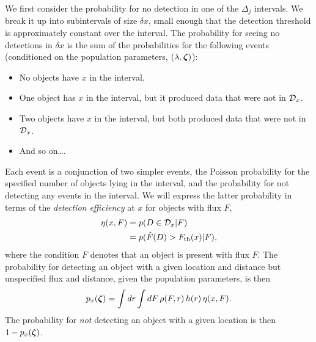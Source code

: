 We first consider the probability for no detection in one of the $\Delta_j$ intervals.
We break it up into subintervals of size $\delta x$, small enough that the detection threshold is approximately constant over the interval.
The probability for seeing no detections in $\delta x$ is the sum of the probabilities for the following events (conditioned on the population parameters, $(\lambda,\boldsymbol{\zeta})$):
\begin{itemize}
\item No objects have $x$ in the interval.
\item One object has $x$ in the interval, but it produced data that were not in $\mathcal{D}_x$.
\item Two objects have $x$ in the interval, but both produced data that were not in $\mathcal{D}_x$.
\item And so on\ldots.
\end{itemize}
Each event is a conjunction of two simpler events, the Poisson probability for the specified number of objects lying in the interval, and the probability for not detecting any events in the interval.
We will express the latter probability in terms of the \emph{detection efficiency} at $x$ for objects with flux $F$,
\begin{align}\label{eq:eta-def}
\eta(x,F) 
  &= p(D\in\mathcal{D}_x | F)\\
  &= p(\hat{F}(D) > F_{\rm th}(x) | F),
\end{align}
where the condition $F$ denotes that an object is present with flux $F$.
The probability for detecting an object with a given location and distance but unspecified flux and distance, given the population parameters, is then
\begin{equation}\label{eq:p-x}
p_x(\boldsymbol{\zeta}) = \int dr \int dF\,\rho(F,r)\, h(r)\, \eta(x,F).
\end{equation}
The probability for \emph{not} detecting an object with a given location is then $1-p_x(\boldsymbol{\zeta})$.

